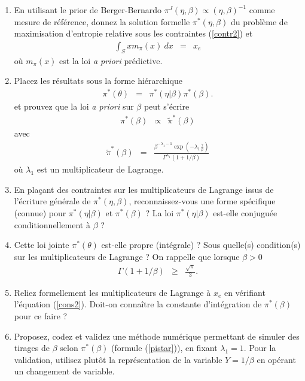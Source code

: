 \documentclass[10pt]{article}
\newcommand{\1}{\mathbbm{1}}
\begin{document}
\begin{enumerate}
\begin{enumerate}
\item En utilisant le prior de Berger-Bernardo $\pi^J(\eta,\beta)\propto (\eta,\beta)^{-1}$ comme mesure de r\'ef\'erence, donnez la solution formelle $\pi^*(\eta,\beta)$  du probl\`eme de maximisation d'entropie relative sous les contraintes (\ref{contr2}) et
\begin{eqnarray}
\int_S x m_{\pi}(x) \ dx & = & x_e \label{cons2}
\end{eqnarray}
o\`u $m_{\pi}(x)$ est la loi {\it a priori} pr\'edictive. 
\item Placez les r\'esultats sous la forme hi\'erarchique 
\begin{eqnarray*}
\pi^*(\theta) & = & \pi^*(\eta|\beta)\pi^*(\beta).
\end{eqnarray*}
et prouvez que la loi {\it a priori} sur $\beta$ peut s'\'ecrire
\begin{eqnarray*}
\pi^*(\beta) & \propto & \tilde{\pi}^*(\beta) 
\end{eqnarray*}
avec
\begin{eqnarray}
\tilde{\pi}^*(\beta) & = & \frac{\beta^{-\lambda_1-1}\exp\left(-\lambda_1 \frac{\gamma}{\beta}\right)}{\Gamma^{\lambda_1}(1+1/\beta)}\label{pistar}
\end{eqnarray}
o\`u $\lambda_1$ est un multiplicateur de Lagrange. 
\item En pla\c cant des contraintes sur les multiplicateurs de Lagrange issus de l'\'ecriture g\'en\'erale de $\pi^*(\eta,\beta)$, reconnaissez-vous une forme sp\'ecifique (connue) pour $\pi^*(\eta|\beta)$ et $\pi^*(\beta)$ ? La loi $\pi^*(\eta|\beta)$ est-elle conjugu\'ee conditionnellement \`a $\beta$ ? 
\item Cette loi jointe $\pi^*(\theta)$ est-elle propre (int\'egrale) ? Sous quelle(s) condition(s) sur les multiplicateurs de Lagrange ? On rappelle que lorsque $\beta>0$ \begin{eqnarray}
\Gamma(1+1/\beta) & \geq & \frac{\sqrt{\pi}}{3}  \label{borne.min}.
\end{eqnarray}
\item Reliez formellement les multiplicateurs de Lagrange \`a $x_e$ en v\'erifiant l'\'equation (\ref{cons2}). Doit-on conna\^itre la constante d'int\'egration de $\pi^*(\beta)$ pour ce faire ? 
\item Proposez, codez et validez une m\'ethode num\'erique permettant de simuler des tirages de $\beta$ selon $\pi^*(\beta)$ (formule (\ref{pistar})), en fixant $\lambda_1=1$. Pour la validation, utilisez plut\^ot la repr\'esentation de la variable $Y=1/\beta$ en op\'erant un changement de variable.
\end{enumerate}
\end{enumerate}
\end{document}
